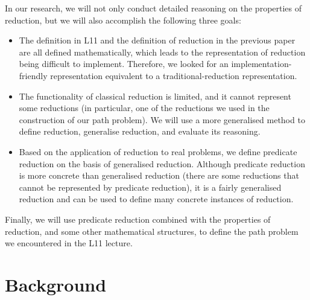 \documentclass[a4paper,12pt,twoside,openright]{report}
\begin{document}
In our research, we will not only conduct detailed reasoning on the properties of reduction, but we will also accomplish the following three goals:
\begin{itemize}
  \item The definition in L11 and the definition of reduction in the previous paper are all defined mathematically, which leads to the representation of reduction being difficult to implement. Therefore, we looked for an implementation-friendly representation equivalent to a traditional-reduction representation.
  \item The functionality of classical reduction is limited, and it cannot represent some reductions (in particular, one of the reductions we used in the construction of our path problem). We will use a more generalised method to define reduction, generalise reduction, and evaluate its reasoning. 
  \item Based on the application of reduction to real problems, we define predicate reduction on the basis of generalised reduction. Although predicate reduction is more concrete than generalised reduction (there are some reductions that cannot be represented by predicate reduction), it is a fairly generalised reduction and can be used to define many concrete instances of reduction. 
\end{itemize}
Finally, we will use predicate reduction combined with the properties of reduction, and some other mathematical structures, to define the path problem we encountered in the L11 lecture.

\chapter{Background} 

%
\end{document}
